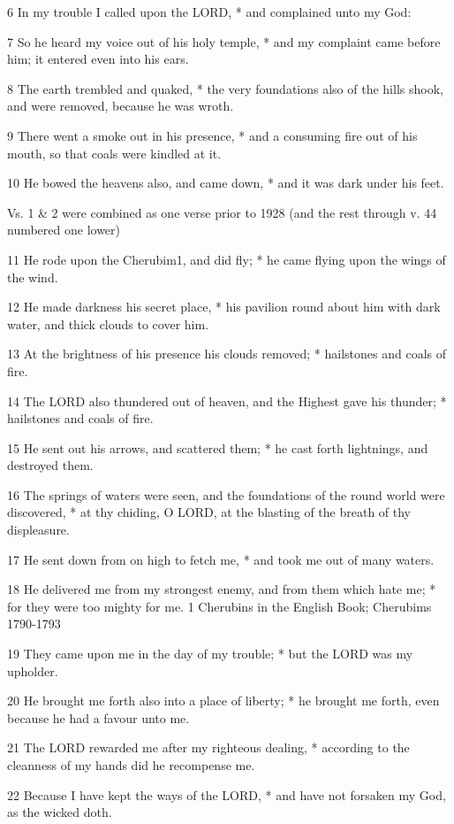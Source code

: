6 In my trouble I called upon the LORD,
* and complained unto my God:

7 So he heard my voice out of his holy temple, * and
my complaint came before him; it entered even into his ears.

8
The earth trembled and quaked, * the very foundations also of the hills
shook, and were removed, because he was wroth.

9 There went a smoke out in his presence, * and a consuming
fire out of his mouth, so that coals were kindled at it.

10 He bowed the heavens also, and came down, * and
it was dark under his feet.

Vs.
1 \& 2 were combined as one verse prior to 1928 (and the rest through
v. 44 numbered one lower)

11 He rode upon the Cherubim1, and did fly; * he came flying
upon the wings of the wind.

12 He made darkness his secret place, * his pavilion
round about him with dark water, and thick clouds to cover him.

13 At the brightness of his presence his clouds removed;
* hailstones and coals of fire.

14 The LORD also thundered out
of heaven, and the Highest gave his thunder; * hailstones and coals of fire.

15 He sent out his arrows, and scattered them; * he cast
forth lightnings, and destroyed them.

16 The springs of waters were seen, and the foundations
of the round world were discovered, * at thy chiding, O LORD,
at the blasting of the breath of thy displeasure.

17 He sent down from on high to fetch me, * and took
me out of many waters.

18 He delivered me from my strongest enemy, and from
them which hate me; * for they were too mighty for me. 1 Cherubins in
the English Book; Cherubims 1790-1793

19 They came upon me in the day of my trouble; * but
the LORD was my upholder.

20 He brought me forth also into a place of liberty;
* he brought me forth, even because he had a favour unto me.

21
The LORD rewarded me after my righteous dealing,
* according to the cleanness of my hands did he recompense me.

22 Because I have kept the ways of the LORD,
* and have not forsaken my God, as the wicked doth.


